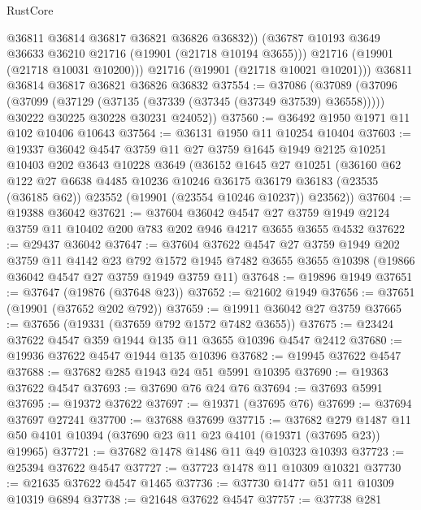 \begin{lexlean}{RustCore}
\begin{coremodule}
            @36811
            @36814
            @36817
            @36821
            @36826
            @36832))
        (@36787 @10193 @3649 @36633 @36210 @21716 (@19901 (@21718 @10194 @3655)))
        @21716
        (@19901 (@21718 @10031 @10200)))
      @21716
      (@19901 (@21718 @10021 @10201)))
    @36811
    @36814
    @36817
    @36821
    @36826
    @36832
@37554 := @37086
    (@37089
      (@37096
        (@37099 (@37129 (@37135 (@37339 (@37345 (@37349 @37539) @36558)))))
        @30222
        @30225
        @30228
        @30231
        @24052))
@37560 := @36492 @1950 @1971 @11 @102 @10406 @10643
@37564 := @36131 @1950 @11 @10254 @10404
@37603 := @19337
    @36042
    @4547
    @3759
    @11
    @27
    @3759
    @1645
    @1949
    @2125
    @10251
    @10403
    @202
    @3643
    @10228
    @3649
    (@36152
      @1645
      @27
      @10251
      (@36160
        @62
        @122
        @27
        @6638
        @4485
        @10236
        @10246
        @36175
        @36179
        @36183
        (@23535 (@36185 @62))
        @23552
        (@19901 (@23554 @10246 @10237))
        @23562))
@37604 := @19388 @36042
@37621 := @37604
    @36042
    @4547
    @27
    @3759
    @1949
    @2124
    @3759
    @11
    @10402
    @200
    @783
    @202
    @946
    @4217
    @3655
    @3655
    @4532
@37622 := @29437 @36042
@37647 := @37604
    @37622
    @4547
    @27
    @3759
    @1949
    @202
    @3759
    @11
    @4142
    @23
    @792
    @1572
    @1945
    @7482
    @3655
    @3655
    @10398
    (@19866 @36042 @4547 @27 @3759 @1949 @3759 @11)
@37648 := @19896 @1949
@37651 := @37647 (@19876 (@37648 @23))
@37652 := @21602 @1949
@37656 := @37651 (@19901 (@37652 @202 @792))
@37659 := @19911 @36042 @27 @3759
@37665 := @37656 (@19331 (@37659 @792 @1572 @7482 @3655))
@37675 := @23424 @37622 @4547 @359 @1944 @135 @11 @3655 @10396 @4547 @2412
@37680 := @19936 @37622 @4547 @1944 @135 @10396
@37682 := @19945 @37622 @4547
@37688 := @37682 @285 @1943 @24 @51 @5991 @10395
@37690 := @19363 @37622 @4547
@37693 := @37690 @76 @24 @76
@37694 := @37693 @5991
@37695 := @19372 @37622
@37697 := @19371 (@37695 @76)
@37699 := @37694 @37697 @27241
@37700 := @37688 @37699
@37715 := @37682
    @279
    @1487
    @11
    @50
    @4101
    @10394
    (@37690 @23 @11 @23 @4101 (@19371 (@37695 @23)) @19965)
@37721 := @37682 @1478 @1486 @11 @49 @10323 @10393
@37723 := @25394 @37622 @4547
@37727 := @37723 @1478 @11 @10309 @10321
@37730 := @21635 @37622 @4547 @1465
@37736 := @37730 @1477 @51 @11 @10309 @10319 @6894
@37738 := @21648 @37622 @4547
@37757 := @37738
    @281

\end{coremodule}
\end{lexlean}
